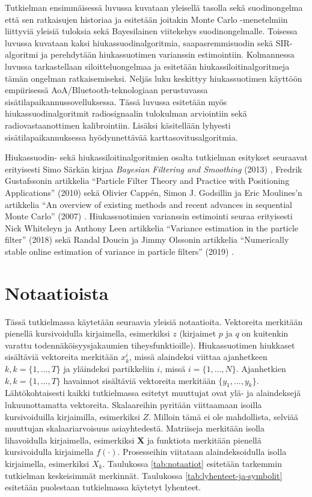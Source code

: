 \documentclass[
  12pt,
  a4paper, twoside]{book}
\begin{document}
Tutkielman ensimmäisessä luvussa kuvataan yleisellä tasolla sekä suodinongelma että sen ratkaisujen historiaa ja esitetään joitakin Monte Carlo -menetelmiin liittyviä yleisiä tuloksia sekä Bayesilainen viitekehys suodinongelmalle. Toisessa luvussa kuvataan kaksi hiukassuodinalgoritmia, saapasremmisuodin sekä SIR-algoritmi ja perehdytään hiukassuotimen varianssin estimointiin. Kolmannessa luvussa tarkastellaan siloitteluongelmaa ja esitetään hiukassiloitinalgoritmeja tämän ongelman ratkaisemiseksi. Neljäs luku keskittyy hiukassuotimen käyttöön empiirisessä AoA/Bluetooth-teknologiaan perustuvassa sisätilapaikannussovelluksessa. Tässä luvussa esitetään myös hiukassuodinalgoritmit radiosignaalin tulokulman arviointiin sekä radiovastaanottimen kalibrointiin. Lisäksi käsitellään lyhyesti sisätilapaikannuksessa hyödynnettävää karttasovitusalgoritmia.

Hiukassuodin- sekä hiukassiloitinalgoritmien osalta tutkielman esitykset seuraavat erityisesti Simo Särkän kirjaa \textit{Bayesian Filtering and Smoothing} (2013) \citep{sarkka-2013}, Fredrik Gustafssonin artikkelia ``Particle Filter Theory and Practice with Positioning Applications'' (2010) \citep{gustafsson-2010} sekä Olivier Cappén, Simon J. Godsillin ja Eric Moulines'n artikkelia ``An overview of existing methods and recent advances in sequential Monte Carlo'' (2007) \citep{cappe-2007}. Hiukassuotimien varianssin estimointi seuraa erityisesti Nick Whiteleyn ja Anthony Leen artikkelia ``Variance estimation in the particle filter'' (2018) \citep{Lee-2018} sekä Randal Doucin ja Jimmy Olssonin artikkelia ``Numerically stable online estimation of variance in particle filters'' (2019) \citep{olsson-2019}.

\section{Notaatioista}

Tässä tutkielmassa käytetään seuraavia yleisiä notaatioita. Vektoreita merkitään pienellä kursivoidulla kirjaimella, esimerkiksi \(z\) (kirjaimet \(p\) ja \(q\) on kuitenkin varattu todennäköisyysjakaumien tiheysfunktioille). Hiukassuotimen hiukkaset sisältäviä vektoreita merkitään \(x_k^i\), missä alaindeksi viittaa ajanhetkeen \(k, k=\{1,\ldots,T\}\) ja yläindeksi partikkeliin \(i\), missä \(i=\{1,\ldots,N\}\). Ajanhetkien \(k, k=\{1,\ldots,T\}\) havainnot sisältäviä vektoreita merkitään \(\{y_1,\ldots,y_k\}\). Lähtökohtaisesti kaikki tutkielmassa esitetyt muuttujat ovat ylä- ja alaindeksejä lukuunottamatta vektoreita. Skalaareihin pyritään viittaamaan isoilla kursivoiduilla kirjaimilla, esimerkiksi \(Z\). Milloin tämä ei ole mahdollista, selviää muuttujan skalaariarvoisuus asiayhtedestä. Matriiseja merkitään isolla lihavoidulla kirjaimella, esimerkiksi \(\mathbf{X}\) ja funktiota merkitään pienellä kursivoidulla kirjaimella \(f(\cdot)\). Prosesseihin viitataan alaindeksoidulla isolla kirjaimella, esimerkiksi \(X_k\). Taulukossa \ref{tab:notaatiot} esitetään tarkemmin tutkielman keskeisimmät merkinnät. Taulukossa \ref{tab:lyhenteet-ja-symbolit} esitetään puolestaan tutkielmassa käytetyt lyhenteet.
\end{document}

